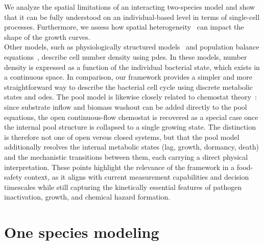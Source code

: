 \documentclass[10pt,1p,authoryear]{elsarticle}
\numberwithin{equation}{section}
\begin{document}
We analyze the spatial limitations of an interacting two-species model and show that it can be fully understood on an individual-based level in terms of single-cell processes.
Furthermore, we assess how spatial heterogeneity~\citep{mckellar_heterogeneous_1997} can impact the shape of the growth curves.\\
%
Other models, such as physiologically structured models~\citep{metzDynamics1986, Diekmann2007} and population balance equations~\citep{fredricksonPopulationBalance2003}, describe cell number density using \acp{pde}.
In these models, number density is expressed as a function of the individual bacterial state, which exists in a continuous space.
In comparison, our framework provides a simpler and more straightforward way to describe the bacterial cell cycle using discrete metabolic states and \acp{ode}.
The pool model is likewise closely related to chemostat theory~\citep{smith1995theory}: since substrate inflow and biomass washout can be added directly to the pool equations, the open continuous-flow chemostat is recovered as a special case once the internal pool structure is collapsed to a single growing state.
The distinction is therefore not one of open versus closed systems, but that the pool model additionally resolves the internal metabolic states (lag, growth, dormancy, death) and the mechanistic transitions between them, each carrying a direct physical interpretation.
These points highlight the relevance of the framework in a food-safety context, as it aligns with current measurement capabilities and decision timescales while still capturing the kinetically essential features of pathogen inactivation, growth, and chemical hazard formation.
%
\section{One species modeling}
\end{document}
